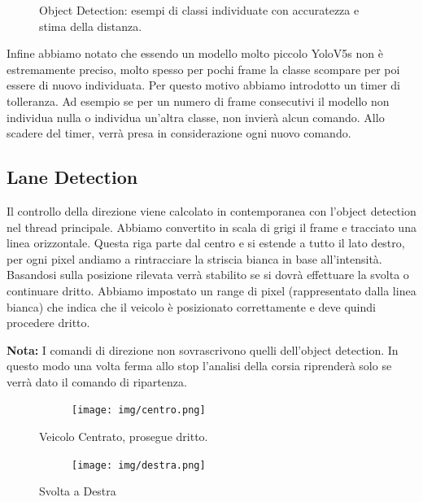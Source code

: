 \documentclass{article}
\begin{document}
\begin{figure}[h!]
    \caption{Object Detection: esempi di classi individuate con accuratezza e stima della distanza.}
    \label{fig:object_detection}
\end{figure}



    Infine abbiamo notato che essendo un modello molto piccolo YoloV5s non è estremamente preciso, molto spesso per pochi frame la classe scompare per poi essere di nuovo individuata. Per questo motivo abbiamo introdotto un timer di tolleranza. Ad esempio se per un numero di frame consecutivi il modello non individua nulla o individua un'altra classe, non invierà alcun comando. Allo scadere del timer, verrà presa in considerazione ogni nuovo comando.
    

  
\newpage

\subsection{Lane Detection}
Il controllo della direzione viene calcolato in contemporanea con l'object detection nel thread principale. Abbiamo convertito in scala di grigi il frame e tracciato una linea orizzontale. Questa riga parte dal centro e si estende a tutto il lato destro, per ogni pixel andiamo a rintracciare la striscia bianca in base all'intensità. Basandosi sulla posizione rilevata verrà stabilito se si dovrà effettuare la svolta o continuare dritto. Abbiamo impostato un range di pixel (rappresentato dalla linea bianca) che indica che il veicolo è posizionato correttamente e deve quindi procedere dritto. 

\textbf{Nota:} I comandi di direzione non sovrascrivono quelli dell'object detection. In questo modo una volta ferma allo stop l'analisi della corsia riprenderà solo se verrà dato il comando di ripartenza. 

\begin{figure}[h!]
    \centering
    \begin{subfigure}[b]{0.8\linewidth}
        \centering
        \texttt{[image: img/centro.png]}
        \label{fig:centro}
    \end{subfigure}
    \label{fig:posizione-centro}
    \caption{Veicolo Centrato, prosegue dritto.}
\end{figure}

\begin{figure}[h!]
    \centering
    \begin{subfigure}[b]{0.8\linewidth}
        \centering
        \texttt{[image: img/destra.png]}
        \label{fig:destra}
    \end{subfigure}
        \caption{Svolta a Destra}
    \label{fig:posizione-destra}
\end{figure}
\end{document}

